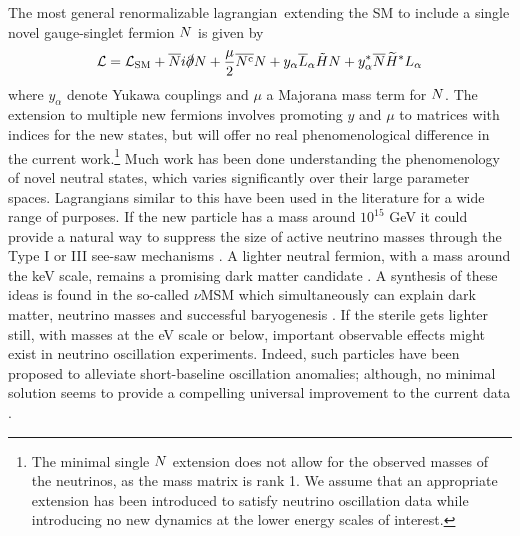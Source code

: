 \documentclass[11pt, a4paper]{article}
\def\lagrangian{lagrangian}
\def\ster{\ensuremath N}
\begin{document}
The most general renormalizable \lagrangian\ extending the SM to include a
single novel gauge-singlet fermion $\ster$ is given by
%
\begin{align}   \mathcal{L} = \mathcal{L}_\text{SM} +
\overline{\ster}i\slashed{\partial}\ster+ \frac{\mu}{2}
\overline{\ster^\text{c}}\ster  + y_\alpha\overline{L}_\alpha\tilde{H} \ster +
y_\alpha^* \overline{\ster}\widetilde{H}^*L_\alpha\label{eq:minimallag}
\end{align}
%
where $y_\alpha$ denote Yukawa couplings and $\mu$ a Majorana mass term for
$\ster$. The extension to multiple new fermions involves promoting $y$ and
$\mu$ to matrices with indices for the new states, but will offer no real
phenomenological difference in the current work.\footnote{The minimal single
$\ster$ extension does not allow for the observed masses of the neutrinos, as
the mass matrix is rank 1. We assume that an appropriate extension has been
introduced to satisfy neutrino oscillation data while introducing no new
dynamics at the lower energy scales of interest.} Much work has been done
understanding the phenomenology of novel neutral states, which varies
significantly over their large parameter spaces. 
%
Lagrangians similar to this have been used in the literature for a wide range
of purposes. If the new particle has a mass around $10^{15}$ GeV it could
provide a natural way to suppress the size of active neutrino masses through
the Type I or III see-saw mechanisms \cite{Minkowski:1977sc, GellMann:1980vs,
Mohapatra:1979ia}. A lighter neutral fermion, with a mass around the keV scale,
remains a promising dark matter candidate \cite{Adhikari:2016bei}. A synthesis
of these ideas is found in the so-called $\nu$MSM which simultaneously can
explain dark matter, neutrino masses and successful baryogenesis
\cite{Asaka:2005pn}. 
%
If the sterile gets lighter still, with masses at the eV scale or below,
important observable effects might exist in neutrino oscillation experiments.
Indeed, such particles have been proposed to alleviate short-baseline
oscillation anomalies; although, no minimal solution seems to provide a
compelling universal improvement to the current data \cite{Kopp:2013vaa,Conrad:2012qt}.
\end{document}

